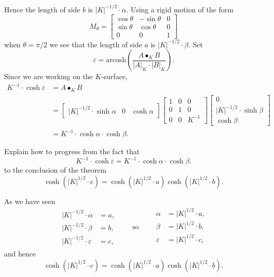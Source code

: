 \documentclass[newpage,hints,,12pt,noauthor,nooutcomes,handout]{ximera}
\begin{document}
Hence the length of side $b$ is $|K|^{-1/2}\cdot\alpha$. Using a rigid motion of the form
\[
M_\theta=
\begin{bmatrix}
  \cos\theta & -\sin\theta & 0\\
  \sin\theta & \cos\theta & 0\\
  0 & 0 & 1
\end{bmatrix}
\]
when $\theta = \pi/2$ we see that the length of side $a$ is $|K|^{-1/2}\cdot
\beta$. Set
\[
\varepsilon = \mathrm{arcosh}\left(\frac{A\bullet_K B}{|A|_K\cdot |B|_K}\right).
\]
Since we are working on the $K$-surface,
\begin{align*}
  K^{-1}\cdot \cosh \varepsilon &= A\bullet_K B\\
  &=
  \begin{bmatrix}
    |K|^{-1/2}\cdot \sinh\alpha &  0 & \cosh\alpha
  \end{bmatrix}
    \begin{bmatrix}
      1 & 0 & 0\\
      0 & 1 & 0\\
      0 & 0 & K^{-1}
    \end{bmatrix}
    \begin{bmatrix}
      0\\
      |K|^{-1/2}\cdot\sinh\beta\\
      \cosh\beta
    \end{bmatrix}\\
   &=K^{-1} \cdot \cosh\alpha \cdot \cosh\beta.
\end{align*}


\begin{problem}
  Explain how to progress from the fact that
  \[
  K^{-1}\cdot \cosh \varepsilon = K^{-1} \cdot \cosh\alpha \cdot \cosh\beta.
  \]
  to the conclusion of the theorem
  \[
  \cosh(|K|^{1/2}\cdot c)=\cosh(|K|^{1/2} \cdot a)\cosh(|K|^{1/2}\cdot b).
  \]
  \begin{freeResponse}
    As we have seen
    \[
    \begin{split}
      |K|^{-1/2}\cdot \alpha &= a,\\
      |K|^{-1/2}\cdot \beta  &= b,\\
      |K|^{-1/2}\cdot \varepsilon &= c,
    \end{split}
    \qquad\text{so}\qquad
    \begin{split}
      \alpha &= |K|^{1/2} \cdot a,\\
      \beta  &= |K|^{1/2} \cdot b,\\
      \varepsilon &= |K|^{1/2} \cdot c,\\
    \end{split}
    \]
    and hence
    \[
      \cosh\left(|K|^{1/2}\cdot c\right)=\cosh\left(|K|^{1/2} \cdot a\right)\cosh\left(|K|^{1/2}\cdot b\right).
    \]
  \end{freeResponse}
\end{problem}
\end{document}
